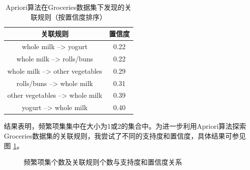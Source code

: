 \documentclass[12pt,a4paper]{article}
\theoremstyle{definition}
\begin{document}
\begin{table}[H]
	\renewcommand\arraystretch{1.35}
	\caption{Apriori算法在Groceries数据集下发现的关联规则（按置信度排序）}
	\label{tab:apriori_gro_con}
	\centering
	
	\begin{tabular}{c|c}
		\centering
		关联规则 & 置信度 \\
		\hline
		whole milk --> yogurt & 0.22 \\
		whole milk --> rolls/buns & 0.22 \\
		whole milk --> other vegetables & 0.29 \\
		rolls/buns --> whole milk & 0.31 \\
		other vegetables --> whole milk & 0.39 \\
		yogurt --> whole milk & 0.40 \\
	\end{tabular}
\end{table}

结果表明，频繁项集集中在大小为1或2的集合中。为进一步利用Apriori算法探索Groceries数据集的关联规则，我尝试了不同的支持度和置信度，具体结果可参见图 \ref{fig:apriori}。

\begin{figure}[H]
	\centering
	\caption{频繁项集个数及关联规则个数与支持度和置信度关系}
	\label{fig:apriori}
\end{figure}
\end{document}
